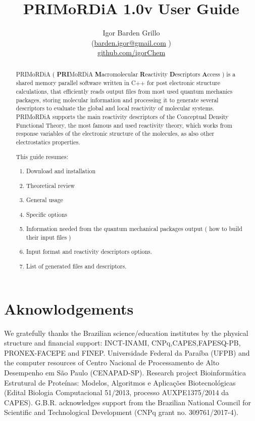 \documentclass[a4paper,11pt]{refart}
\title{PRIMoRDiA 1.0v User Guide}
\author{Igor Barden Grillo \\(\url{barden.igor@gmail.com} )\\\url{github.com/igorChem}}
\begin{document}
\maketitle

\begin{abstract}
PRIMoRDiA ( \textbf{PRI}MoRDiA \textbf{M}acromolecular \textbf{R}eactivity \textbf{D}escriptors \textbf{A}ccess ) is a shared memory parallel software written in C++ for post electronic structure calculations, that efficiently reads output files from most used quantum mechanics packages, storing molecular information and processing it to generate several descriptors to evaluate the global and local reactivity of molecular systems. PRIMoRDiA supports the main reactivity descriptors of the Conceptual Density Functional Theory, the most famous and used reactivity theory, which works from response variables of the electronic structure of the molecules, as also other electrostatics properties.

This guide resumes: 
\begin{enumerate}
	\item Download and installation
	\item Theoretical review
	\item General usage
	\item Specific options
	\item Information needed from the quantum mechanical packages output ( how to build their input files )
	\item Input format and reactivity descriptors options.
	\item List of generated files and descriptors.
\end{enumerate}

\end{abstract}
\newpage
\tableofcontents
\newpage

\section*{Aknowlodgements}

We gratefully thanks the Brazilian science/education institutes by the physical structure and financial support: INCT-INAMI, CNPq,CAPES,FAPESQ-PB, PRONEX-FACEPE and FINEP. Universidade Federal da Paraíba (UFPB) and the computer resources of Centro Nacional de Processamento de Alto Desempenho em São Paulo (CENAPAD-SP). 		
Research project Bioinformática Estrutural de Proteínas: Modelos, Algoritmos e Aplicações Biotecnológicas (Edital Biologia Computacional 51/2013, processo AUXPE1375/2014 da CAPES). G.B.R. acknowledges support from the Brazilian National Council for Scientific and Technological Development (CNPq grant no. 309761/2017-4).
\end{document}
